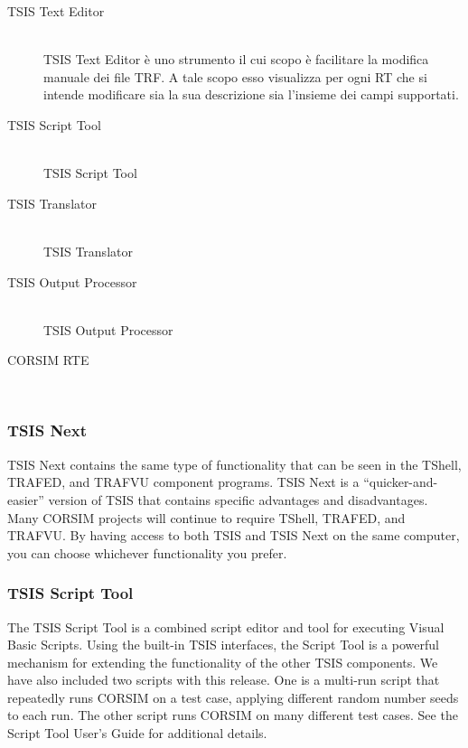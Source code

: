 \begin{description}
\item[TSIS Text Editor] \hfill \\
\acs{TSIS} Text Editor è uno strumento il cui scopo è facilitare la modifica manuale dei file \acs{TRF}. A tale scopo esso visualizza per ogni \acs{RT} che si intende modificare sia la sua descrizione sia l'insieme dei campi supportati.
\item[TSIS Script Tool] \hfill \\
\acs{TSIS} Script Tool
\item[TSIS Translator] \hfill \\
\acs{TSIS} Translator
\item[TSIS Output Processor] \hfill \\
\acs{TSIS} Output Processor
\item[CORSIM RTE] \hfill \\

\end{description}


\subsubsection{TSIS Next}

TSIS Next contains the same type of functionality that can be seen in the TShell, TRAFED, and TRAFVU
component programs. TSIS Next is a “quicker-and-easier” version of TSIS that contains specific advantages and
disadvantages. Many CORSIM projects will continue to require TShell, TRAFED, and TRAFVU. By having
access to both TSIS and TSIS Next on the same computer, you can choose whichever functionality you prefer.

\subsubsection{TSIS Script Tool}

The TSIS Script Tool is a combined script editor and tool for executing Visual Basic Scripts. Using the built-in
TSIS interfaces, the Script Tool is a powerful mechanism for extending the functionality of the other TSIS
components. We have also included two scripts with this release. One is a multi-run script that repeatedly runs
CORSIM on a test case, applying different random number seeds to each run. The other script runs CORSIM on
many different test cases. See the Script Tool User's Guide for additional details.

